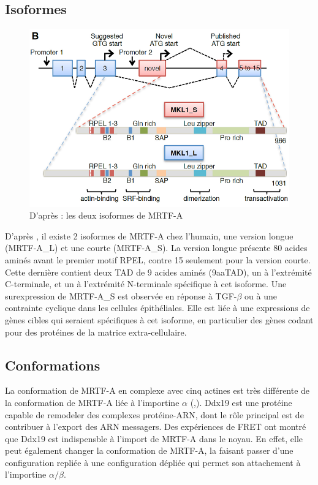 \subsection{Isoformes}
 \begin{figure}[h!]
 \includegraphics[scale=0.5]{MRTF_isoformes.png}
 \caption{D'après \cite{scharenberg_tgf-_2014} : les deux isoformes de MRTF-A}
 
 \end{figure}
 D'après \cite{scharenberg_tgf-_2014}, il existe 2 isoformes de MRTF-A chez l'humain, une version longue (MRTF-A\_L) et une courte (MRTF-A\_S). La version longue présente 80 acides aminés avant le premier motif RPEL, contre 15 seulement pour la version courte. Cette dernière contient deux TAD de 9 acides aminés (9aaTAD), un à l'extrémité C-terminale, et un à l'extrémité N-terminale spécifique à cet isoforme. Une surexpression de MRTF-A\_S est observée en réponse à TGF-$\beta$ ou à une contrainte cyclique dans les cellules épithéliales. Elle est liée à une expressions de gènes cibles qui seraient spécifiques à cet isoforme, en particulier des gènes codant pour des protéines de la matrice extra-cellulaire. 
 
 
\subsection{Conformations}

La conformation de MRTF-A en complexe avec cinq actines est très différente de la conformation de MRTF-A liée à l'importine $\alpha$ (\cite{hirano_sensing_2011},\cite{treisman_structure_2011}). 
Ddx19 est une protéine capable de remodeler des complexes protéine-ARN, dont le rôle principal est de contribuer à l'export des ARN messagers. Des expériences de FRET ont montré que Ddx19 est indispensble à l'import de MRTF-A dans le noyau. En effet, elle peut également changer la conformation de MRTF-A, la faisant passer d'une configuration repliée à une configuration dépliée qui permet son attachement à l'importine $\alpha/\beta$.


